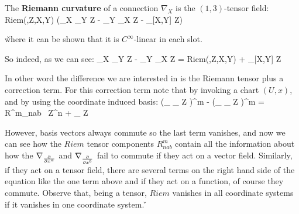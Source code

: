The \textbf{Riemann curvature} of a connection $\nabla_X$ is the $(1,3)$-tensor field:
\bse
Riem(\omega,Z,X,Y) \coloneqq \omega(\nabla_X \nabla_Y Z - \nabla_Y \nabla_X Z - \nabla_{[X,Y]} Z)
\ese

\v

where it can be shown that it is $C^{\infty}$-linear in each slot.
\ed

So indeed, as we can see:
\bse
\nabla_X \nabla_Y Z - \nabla_Y \nabla_X Z = Riem(\cdot,Z,X,Y) + \nabla_{[X,Y]} Z
\ese

In other word the difference we are interested in is the Riemann tensor plus a correction term. For this correction
term note that by invoking a chart $(U,x)$, and by using the coordinate induced basis:
\bse
\left(\nabla_{} \nabla_{} Z \right)^m - \left (\nabla_{} \nabla_{}
Z \right)^m = R^{m}_{nab} \, Z^n + \nabla_{} Z
\ese

However, basis vectors always commute so the last term vanishes, and now we can see how the $Riem$ tensor components
$R^{m}_{nab}$ contain all the information about how the $\nabla_{\frac{\partial }{\partial x^a}}$ and $\nabla_{\frac{\partial }{\partial x^b}}$ fail to
commute if they act on a vector field. Similarly, if they act on a tensor field, there are several terms on the right
hand side of the equation like the one term above and if they act on a function, of course they commute. Observe
that, being a tensor, $Riem$ vanishes in all coordinate systems if it vanishes in one coordinate system. \v

